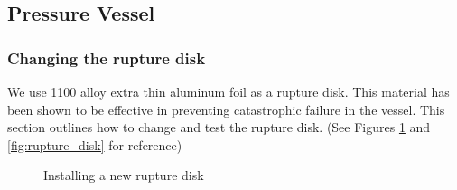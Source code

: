 \documentclass[letterpaper,11pt]{article}
\begin{document}
\subsection{Pressure Vessel}
\subsubsection{Changing the rupture disk}
We use 1100 alloy extra thin aluminum foil as a rupture disk. This material has 
been shown to be effective in preventing catastrophic failure in the vessel. 
This section outlines how to change and test the rupture disk. (See Figures 
\ref{fig:rupture disk_assemble} and \ref{fig:rupture_disk} for reference)

\begin{figure}[H]
    \centering
    \caption{Installing a new rupture disk}
    \label{fig:rupture disk_assemble}
\end{figure}
\end{document}
